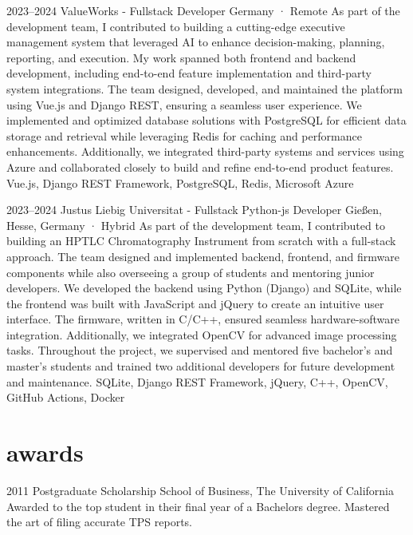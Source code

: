 \documentclass[a4paper,nocolors]{cv-friggeri-x}
\begin{document}
\begin{entrylist}
\entryexperience
{2023--2024}
{ValueWorks - Fullstack Developer}
{Germany · Remote}
{As part of the development team, I contributed to building a cutting-edge executive management system that leveraged AI to enhance decision-making, planning, reporting, and execution. My work spanned both frontend and backend development, including end-to-end feature implementation and third-party system integrations. The team designed, developed, and maintained the platform using Vue.js and Django REST, ensuring a seamless user experience. We implemented and optimized database solutions with PostgreSQL for efficient data storage and retrieval while leveraging Redis for caching and performance enhancements. Additionally, we integrated third-party systems and services using Azure and collaborated closely to build and refine end-to-end product features.}
{Vue.js, Django REST Framework, PostgreSQL, Redis, Microsoft Azure}

\entryexperience
{2023--2024}
{Justus Liebig Universitat - Fullstack Python-js Developer}
{Gießen, Hesse, Germany · Hybrid}
{As part of the development team, I contributed to building an HPTLC Chromatography Instrument from scratch with a full-stack approach. The team designed and implemented backend, frontend, and firmware components while also overseeing a group of students and mentoring junior developers. We developed the backend using Python (Django) and SQLite, while the frontend was built with JavaScript and jQuery to create an intuitive user interface. The firmware, written in C/C++, ensured seamless hardware-software integration. Additionally, we integrated OpenCV for advanced image processing tasks. Throughout the project, we supervised and mentored five bachelor’s and master’s students and trained two additional developers for future development and maintenance.}
{SQLite, Django REST Framework, jQuery, C++, OpenCV, GitHub Actions, Docker}

\end{entrylist}


\section{awards}

\begin{entrylist}


\entry
{2011}
{Postgraduate Scholarship}
{School of Business, The University of California}
{Awarded to the top student in their final year of a Bachelors degree. Mastered the art of filing accurate TPS reports.}


\end{entrylist}
\end{document}
